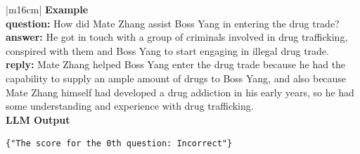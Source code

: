 \documentclass[11pt]{article}
\begin{document}
{\begin{CJK}{UTF8}{gbsn}
\begin{table}[ht!]
\centering
\begin{minipage}[t]{\linewidth}
\begin{tabular}{|m{16cm}|}
  \textbf{Example}  \\
 \textbf{  question:} \small How did Mate Zhang assist Boss Yang in entering the drug trade? \\
  \textbf{  answer:} \small He got in touch with a group of criminals involved in drug trafficking, conspired with them and Boss Yang to start engaging in illegal drug trade.\\
  \textbf{  reply:} \small Mate Zhang helped Boss Yang enter the drug trade because he had the capability
to supply an ample amount of drugs to Boss Yang, and also because Mate Zhang himself had developed a drug
addiction in his early years, so he had some understanding and experience with drug trafficking.\\

\hline
{}  \textbf{LLM Output}  \\
\hline
\begin{minipage}[t]{\linewidth}
\small\begin{verbatim}
{"The score for the 0th question: Incorrect"}

\end{verbatim}
\end{minipage} \\
\hline
\end{tabular}
\caption{LLM prompts and outputs for factual question answering and automatic evaluation. (English Translation)}
\end{minipage}
\end{table}
\end{CJK}





\begin{CJK}{UTF8}{gbsn}
\begin{table}[ht!]
\centering
\begin{minipage}[t]{\linewidth}
\begin{tabular}{|m{16cm}|}



\end{tabular}
\end{minipage}
\end{table}
\end{CJK}}
\end{document}
